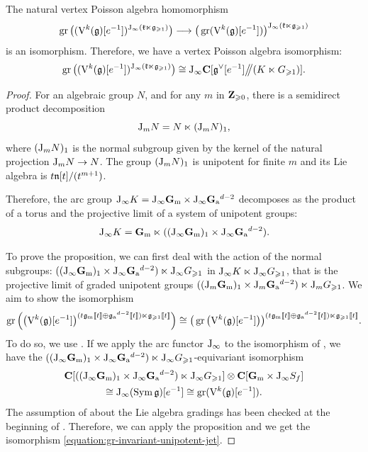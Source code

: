 \begin{proposition} \label{proposition:gr-invariant-borisov-localisation}
	The natural vertex Poisson algebra homomorphism
	\[ \operatorname{gr}\big((\mathrm V^k(\mathfrak g)[e^{-1}])^{\mathrm{J}_\infty(\mathfrak k \ltimes \mathfrak g_{\geqslant 1})}\big) \longrightarrow \big(\operatorname{gr}(\mathrm V^k(\mathfrak g)[e^{-1}])\big)^{\mathrm{J}_\infty(\mathfrak k \ltimes \mathfrak g_{\geqslant 1})} \]
	is an isomorphism. Therefore, we have a vertex Poisson algebra isomorphism:
	\[ \operatorname{gr}\big((\mathrm V^k(\mathfrak g)[e^{-1}])^{\mathrm{J}_\infty(\mathfrak k \ltimes \mathfrak g_{\geqslant 1})}\big) \cong \mathrm{J}_\infty\mathbf{C}[\mathfrak g^\vee[e^{-1}] \big/\!\!\big/ (K \ltimes G_{\geqslant 1})].  \]
\end{proposition}

\begin{proof}
	For an algebraic group $N$, and for any $m$ in $\mathbf{Z}_{\geqslant 0}$, there is a semidirect product decomposition
	\[ \mathrm{J}_m N = N \ltimes (\mathrm{J}_m N)_1, \]
	where $(\mathrm{J}_m N)_1$ is the normal subgroup given by the kernel of the natural projection $\mathrm{J}_m N \rightarrow N$. The group $(\mathrm{J}_m N)_1$ is unipotent for finite $m$ and its Lie algebra is $t \mathfrak n[t] / (t^{m+1})$.
	
	Therefore, the arc group $\mathrm{J}_\infty K = \mathrm{J}_\infty \mathbf{G}_\mathrm{m} \times \mathrm{J}_\infty \mathbf{G}_\mathrm{a}{}^{d-2}$ decomposes as the product of a torus and the projective limit of a system of unipotent groups:
	\[ \mathrm{J}_\infty K = \mathbf{G}_\mathrm{m} \ltimes ((\mathrm{J}_\infty \mathbf{G}_\mathrm{m})_1 \times \mathrm{J}_\infty \mathbf{G}_\mathrm{a}{}^{d-2}). \]
	
	To prove the proposition, we can first deal with the action of the normal subgroups: $((\mathrm{J}_\infty \mathbf{G}_\mathrm{m})_1 \times \mathrm{J}_\infty \mathbf{G}_\mathrm{a}{}^{d-2}) \ltimes \mathrm{J}_\infty G_{\geqslant 1}$ in $\mathrm{J}_\infty K \ltimes \mathrm{J}_\infty G_{\geqslant 1}$, that is the projective limit of graded unipotent groups $((\mathrm{J}_m \mathbf{G}_\mathrm{m})_1 \times \mathrm{J}_m \mathbf{G}_\mathrm{a}{}^{d-2}) \ltimes \mathrm{J}_m G_{\geqslant 1}$. We aim to show the isomorphism
	\begin{equation} \label{equation:gr-invariant-unipotent-jet} \gr \Big(\big(\V^k(\g)[e^{-1}]\big)^{(t \g_{\mathrm m}[\![t]\!] \oplus \g_{\mathrm a}{}^{d-2} [\![t]\!]) \ltimes \g_{\geqslant 1}[\![t]\!]}\Big) \cong \big(\gr \big(\V^k(\g)[e^{-1}]\big)\big)^{(t \g_{\mathrm m}[\![t]\!] \oplus \g_{\mathrm a}{}^{d-2} [\![t]\!]) \ltimes \g_{\geqslant 1}[\![t]\!]}. \end{equation}
	To do so, we use . If we apply the arc functor $\mathrm{J}_\infty$ to the isomorphism of , we have the $((\mathrm{J}_\infty \mathbf{G}_\mathrm{m})_1 \times \mathrm{J}_\infty \mathbf{G}_\mathrm{a}{}^{d-2}) \ltimes \mathrm{J}_\infty G_{\geqslant 1}$-equivariant isomorphism
	\begin{multline*} \mathbf{C}[((\mathrm{J}_\infty \mathbf{G}_\mathrm{m})_1 \times \mathrm{J}_\infty \mathbf{G}_\mathrm{a}{}^{d-2}) \ltimes \mathrm{J}_\infty G_{\geqslant 1}] \otimes \mathbf{C}[\mathbf{G}_\mathrm{m} \times \mathrm{J}_\infty S_f] \\ \cong \mathrm{J}_\infty (\operatorname{Sym} \mathfrak g)[e^{-1}] \cong \operatorname{gr} (\mathrm V^k(\mathfrak g)[e^{-1}]).  \end{multline*}
	The assumption of  about the Lie algebra gradings has been checked at the beginning of . Therefore, we can apply the proposition and we get the isomorphism \eqref{equation:gr-invariant-unipotent-jet}.
	

\end{proof}

